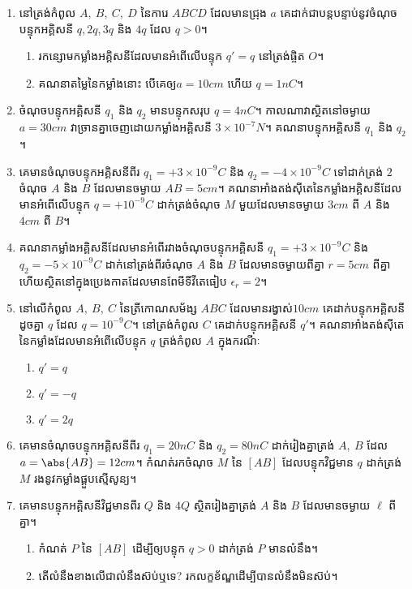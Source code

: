 \begin{enumerate}[m]
		\item នៅត្រង់កំពូល $A,~B,~C,~D$ នៃការេ $ABCD$ ដែលមានជ្រុង $a$ គេដាក់ជាបន្តបន្ទាប់នូវចំណុចបន្ទុកអគ្គិសនី $q,2q,3q$ និង $4q$ ដែល $q>0$។
		\begin{enumerate}[k]
			\item រកន្សោមកម្លាំងអគ្គិសនីដែលមានអំពើលើបន្ទុក $q'=q$ នៅត្រង់ផ្ចិត $O$។
			\item គណនាតម្លៃនៃកម្លាំងនោះ បើគេឲ្យ​ $a=10cm$ ហើយ $q=1nC$។
		\end{enumerate}
		\item ចំណុចបន្ទុកអគ្គិសនី $q_{1}$ និង $q_{2}$ មានបន្ទុកសរុប $q=4nC$។ កាលណាវាស្ថិតនៅចម្ងាយ $a=30cm$ វាច្រានគ្នាចេញដោយកម្លាំងអគ្គិសនី $3\times10^{-7}N$។ គណនាបន្ទុកអគ្គិសនី $q_{1}$ និង $q_{2}$។
		\item គេមានចំណុចបន្ទុកអគ្គិសនីពីរ $q_{1}=+3\times10^{-9}C$ និង $q_{2}=-4\times10^{-9}C$ ទៅដាក់ត្រង់ $2$ ចំណុច $A$ និង $B$ ដែលមានចម្ងាយ $AB=5cm$។
		គណនាអាំងតង់សុីតេនៃកម្លាំងអគ្គិសនីដែលមានអំពើលើបន្ទុក $q=+10^{-9}C$ ដាក់ត្រង់ចំណុច $M$ មួយដែលមានចម្ងាយ $3cm$ ពី $A$ និង $4cm$ ពី $B$។
		\item គណនាកម្លាំងអគ្គិសនីដែលមានអំពើរវាងចំណុចបន្ទុកអគ្គិសនី $q_{1}=+3\times10^{-9}C$ និង $q_{2}=-5\times10^{-9}C$ ដាក់នៅត្រង់ពីរចំណុច $A$ និង $B$ ដែលមានចម្ងាយពីគ្នា $r=5cm$ ពីគ្នា ហើយស្ថិតនៅក្នុងប្រេងកាតដែលមានពែមីទីវីតេធៀប $\epsilon_{r}=2$។
		\item នៅលើកំពូល $A,~B,~C$ នៃត្រីកោណសម័ង្ស $ABC$ ដែលមានរង្វាស់​ $10cm$ គេដាក់បន្ទុកអគ្គិសនីដូចគ្នា $q$ ដែល $q=10^{-9}C$។ នៅត្រង់កំពូល $C$ គេដាក់បន្ទុកអគ្គិសនី $q'$។ គណនាអាំងតង់សុីតេនៃកម្លាំងដែលមានអំពើលើបន្ទុក $q$ ត្រង់កំពូល $A$ ក្នុងករណីៈ 
		\begin{enumerate}[k,3]
			\item $q'=q$ 
			\item $q'=-q$
			\item $q'=2q$
		\end{enumerate}
		\item គេមានចំណុចបន្ទុកអគ្គិសនីពីរ $q_{1}=20nC$ និង $q_{2}=80nC$ ដាក់រៀងគ្នាត្រង់ $A,~B$ ដែល $a=\abs{AB}=12cm$។ កំណត់រកចំណុច $M$ នៃ $[AB]$ ដែលបន្ទុកវិជ្ជមាន $q$ ដាក់ត្រង់ $M$ រងនូវកម្លាំងផ្គួបស្មើសូន្យ។
		\item គេមានបន្ទុកអគ្គិសនីវិជ្ជមានពីរ $Q$ និង $4Q$ ស្ថិតរៀងគ្នាត្រង់ $A$ និង $B$ ដែលមានចម្ងាយ $\ell$ ពីគ្នា។ 
		\begin{enumerate}[k]
			\item កំណត់ $P$ នៃ $[AB]$ ដើម្បីឲ្យបន្ទុក $q>0$ ដាក់ត្រង់ $P$ មានលំនឹង។
			\item តើលំនឹងខាងលើជាលំនឹងស៊ប់ឬទេ? រកលក្ខខ័ណ្ឌដើម្បីបានលំនឹងមិនស៊ប់។

\end{enumerate}
\end{enumerate}
